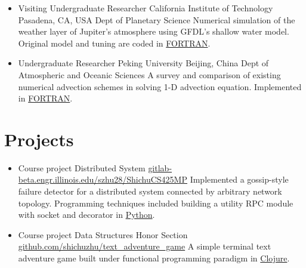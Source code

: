 \documentclass[11pt,a4paper,sans]{moderncv}        %
\begin{document}
\begin{itemize}
	\item{
	      {Visiting Undergraduate Researcher}
	      {California Institute of Technology}
	      {Pasadena, CA, USA}
	      {Dept of Planetary Science}
	      {Numerical simulation of the weather layer of Jupiter's atmosphere using GFDL's shallow water model. Original model and tuning are coded in \underline{FORTRAN}.}
	      }
	      
	\item{
	      {Undergraduate Researcher}
	      {Peking University}
	      {Beijing, China}
	      {Dept of Atmospheric and Oceanic Sciences}
	      {A survey and comparison of existing numerical advection schemes in solving 1-D advection equation. Implemented in \underline{FORTRAN}.}
	      }
	      
\end{itemize}

\vspace{-5pt}
\section{Projects}
\vspace{-5pt}
\begin{itemize}
	\item{
	      {Course project}
	      {\vspace{-10pt}}
	      {}
	      {Distributed System}
	      {
		      \href{https://gitlab-beta.engr.illinois.edu/szhu28/ShichuCS425MP}{\faGitlab \url{gitlab-beta.engr.illinois.edu/szhu28/ShichuCS425MP}}
		      Implemented a gossip-style failure detector for a distributed system connected by arbitrary network topology. Programming techniques included building a utility RPC module with socket and decorator in \underline{Python}.}
	      }
	      
	\item{
	      {Course project}
	      {\vspace{-10pt}}
	      {}
	      {Data Structures Honor Section}
	      {
		      \href{https://github.com/shichuzhu/text_adventure_game}{\faGithub \url{github.com/shichuzhu/text\_adventure\_game}}
		      A simple terminal text adventure game built under functional programming paradigm in \underline{Clojure}.}
	      }
	      
\end{itemize}
\end{document}
